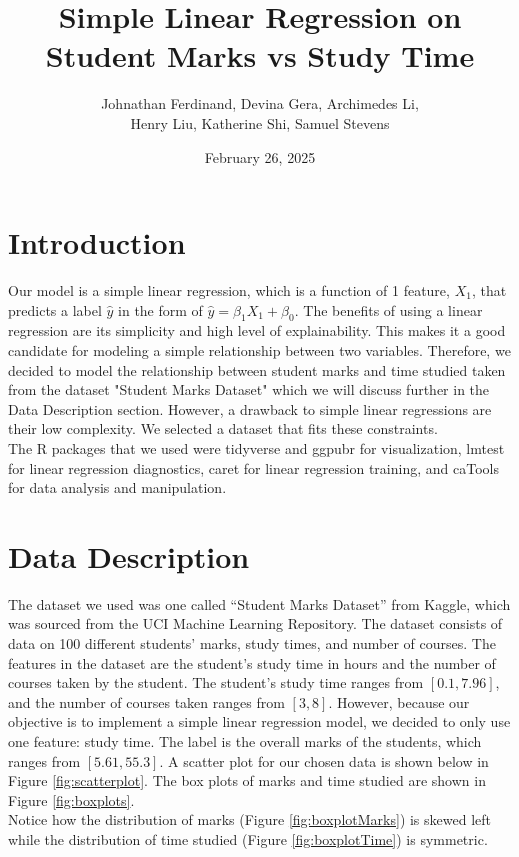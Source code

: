 \documentclass{article}
\title{Simple Linear Regression on Student Marks vs Study Time}
\author{Johnathan Ferdinand, Devina Gera, Archimedes Li, \\ Henry Liu, Katherine Shi, Samuel Stevens}
\date{February 26, 2025}
\begin{document}
\maketitle

\section{Introduction}
Our model is a simple linear regression, which is a function of 1 feature, $X_1$, that predicts a label $\hat{y}$ in the form of $\hat{y} = \beta_1X_1 + \beta_0$.  
The benefits of using a linear regression are its simplicity and high level of explainability.  
This makes it a good candidate for modeling a simple relationship between two variables.  
Therefore, we decided to model the relationship between student marks and time studied taken from the dataset "Student Marks Dataset" which we will discuss further in the Data Description section.
However, a drawback to simple linear regressions are their low complexity.  We selected a dataset that fits these constraints. \\

\noindent The R packages that we used were tidyverse and ggpubr for visualization, lmtest for linear regression diagnostics, caret for linear regression training, and caTools for data analysis and manipulation.

\section{Data Description}
The dataset we used was one called “Student Marks Dataset” from Kaggle, which was sourced from the UCI Machine Learning Repository. The dataset consists of data on 100 different students' marks, study times, and number of courses.  
The features in the dataset are the student’s study time in hours and the number of courses taken by the student.  
The student’s study time ranges from $[0.1, 7.96]$, and the number of courses taken ranges from $[3, 8]$. 
However, because our objective is to implement a simple linear regression model, we decided to only use one feature: study time.
The label is the overall marks of the students, which ranges from $[5.61, 55.3]$.  
A scatter plot for our chosen data is shown below in Figure \ref{fig:scatterplot}. 
The box plots of marks and time studied are shown in Figure \ref{fig:boxplots}. \\

\noindent Notice how the distribution of marks (Figure \ref{fig:boxplotMarks}) is skewed left while the distribution of time studied (Figure \ref{fig:boxplotTime}) is symmetric.
\end{document}
